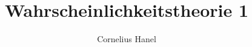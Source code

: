 \documentclass[12pt]{report}
\title{Wahrscheinlichkeitstheorie 1}
\author{Cornelius Hanel}
\date{\parbox{\linewidth}{\centering%
  Last updated: \today\endgraf\bigskip\bigskip\bigskip
Studentische Mitschrift aus dem Wintersemester 2023/24. Fehler oder Erg\"anzungen gerne an \texttt{corneliush99@univie.ac.at}.
\endgraf
}}
\begin{document}
\maketitle
\tableofcontents


\newcommand{\E}{\mathbb{E}}
\newcommand{\cR}{\mathcal{R}}
\newcommand{\cB}{\mathcal{B}}
\newcommand{\C}{\mathbb{C}}
\newcommand{\del}{\partial}
\newcommand{\A}{\mathcal{A}}
\newcommand{\M}{\mathcal{M}}
\newcommand{\G}{\mathcal{G}}
\renewcommand{\geq}{\geqslant}
\renewcommand{\leq}{\leqslant}
\newcommand{\eps}{\varepsilon}
\newcommand{\Pp}{\mathbb{P}}
\newcommand{\R}{\mathbb{R}}
\newcommand{\Var}{\operatorname{Var}}
\newcommand{\pspace}{(\Omega, \mathcal{A}, \Pp)}
\newcommand{\borel}{\mathcal{B}(\R)}
\newcommand{\ind}[1]{\mathds{1}_{#1}}
\newcommand{\nto}[2]{\xrightarrow[#2]{\makebox[1.5em][c]{$\scriptstyle#1$}}}‌
\newcommand{\krestr}[1]{%
  \sbox{0}{\raisebox{\dimexpr\fontcharht\font`A-\height\relax}{$\big|$}}%
  \usebox{0}%
  \raisebox{\dimexpr-\dp0+\depth\relax}{$\scriptstyle#1$}%
}



% 






 
\end{document}
